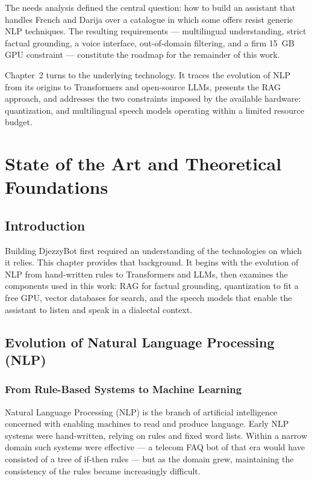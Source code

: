 \documentclass[12pt, a4paper]{report}
\newcommand{\humantext}[1]{#1}      %
\begin{document}
\humantext{The needs analysis defined the central question: how to build an assistant that handles French and Darija over a catalogue in which some offers resist generic NLP techniques. The resulting requirements --- multilingual understanding, strict factual grounding, a voice interface, out-of-domain filtering, and a firm 15~GB GPU constraint --- constitute the roadmap for the remainder of this work.}

\humantext{Chapter~2 turns to the underlying technology. It traces the evolution of NLP from its origins to Transformers and open-source LLMs, presents the RAG approach, and addresses the two constraints imposed by the available hardware: quantization, and multilingual speech models operating within a limited resource budget.}


\chapter{State of the Art and Theoretical Foundations}

\section{Introduction}
\humantext{Building DjezzyBot first required an understanding of the technologies on which it relies. This chapter provides that background. It begins with the evolution of NLP from hand-written rules to Transformers and LLMs, then examines the components used in this work: RAG for factual grounding, quantization to fit a free GPU, vector databases for search, and the speech models that enable the assistant to listen and speak in a dialectal context.}

\section{Evolution of Natural Language Processing (NLP)}

\subsection{From Rule-Based Systems to Machine Learning}
\humantext{Natural Language Processing (NLP) is the branch of artificial intelligence concerned with enabling machines to read and produce language. Early NLP systems were hand-written, relying on rules and fixed word lists. Within a narrow domain such systems were effective --- a telecom FAQ bot of that era would have consisted of a tree of if-then rules --- but as the domain grew, maintaining the consistency of the rules became increasingly difficult.}
\end{document}
